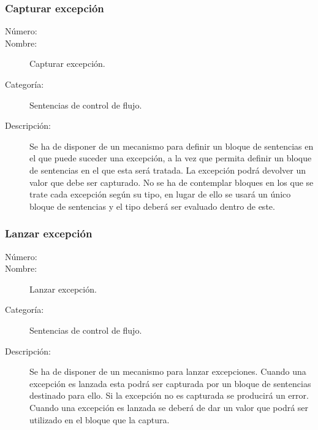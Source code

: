 \subsubsection{Capturar excepción}

\begin{framed}
	\begin{description}
		\item [Número:] \cn
		\item [Nombre:] Capturar excepción.
		\item [Categoría:] Sentencias de control de flujo.
		\item [Descripción:] Se ha de disponer de un mecanismo para definir un bloque de
sentencias en el que puede suceder una excepción, a la vez que permita definir un bloque de sentencias en el que esta será tratada. La excepción podrá devolver un valor que debe ser capturado.
No se ha de contemplar bloques en los que se trate cada excepción según su tipo, en lugar de ello se
usará un único bloque de sentencias y el tipo deberá ser evaluado dentro de este.
	\end {description}
\end{framed}

\subsubsection{Lanzar excepción}

\begin{framed}
	\begin{description}
		\item [Número:] \cn
		\item [Nombre:] Lanzar excepción.
		\item [Categoría:] Sentencias de control de flujo.
		\item [Descripción:] Se ha de disponer de un mecanismo para lanzar excepciones. Cuando una excepción es lanzada esta podrá ser capturada por un bloque de sentencias destinado para ello. Si la excepción no es capturada se producirá un error. Cuando una excepción es lanzada se deberá de dar un valor que podrá ser utilizado en el bloque que la captura.
	\end {description}
\end{framed}
